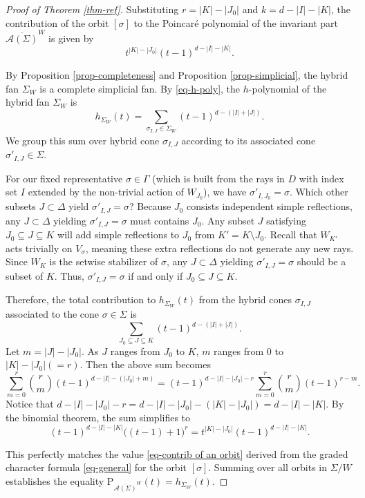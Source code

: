 \documentclass{amsart}
\theoremstyle{definition}
\theoremstyle{remark}
\numberwithin{equation}{section}
\begin{document}
\begin{proof}[Proof of Theorem \ref{thm-ref}]
Substituting $r = |K| - |J_0|$ and $k = d - |I| - |K|$, the contribution of the orbit $[\sigma]$ to the Poincar\'e polynomial of the invariant part $\overline{\mathcal{A}(\Sigma)}^W$ is given by 
\begin{equation} \label{eq-contrib of an orbit}
   t^{|K| - |J_0|} (t-1)^{d - |I| - |K|}.  
\end{equation}

By Proposition \ref{prop-completeness} and Proposition \ref{prop-simplicial}, the hybrid fan $\Sigma_W$ is a complete simplicial fan. By \eqref{eq-h-poly}, the $h$-polynomial of the hybrid fan $\Sigma_W$ is
$$h_{\Sigma_W}(t) = \sum_{\sigma_{I,J} \in \Sigma_W} (t-1)^{d - (|I| + |J|)}.$$
We group this sum over hybrid cone $\sigma_{I,J}$ according to its associated cone $\sigma'_{I,J} \in \Sigma$. 

For our fixed representative $\sigma \in \Gamma$ (which is built from the rays in $D$ with index set $I$ extended by the non-trivial action of $W_{J_0}$), we have $\sigma'_{I, J_0} = \sigma$. 
Which other subsets $J\subset \Delta$ yield $\sigma'_{I,J} = \sigma$? Because $J_0$ consists independent simple reflections, any $J\subset \Delta$ yielding $\sigma'_{I,J} = \sigma$ must contains $J_0$.
Any subset $J$ satisfying $J_0 \subseteq J \subseteq K$ will add simple reflections to $J_0$ from $K' = K \setminus J_0$. Recall that $W_{K'}$ acts trivially on $V_\sigma$, meaning these extra reflections do not generate any new rays. Since $W_{K}$ is the setwise stabilizer of $\sigma$, any $J\subset \Delta$ yielding $\sigma'_{I,J} = \sigma$ should be a subset of $K$. Thus, $\sigma'_{I,J} = \sigma$ if and only if $J_0 \subseteq J \subseteq K$.

Therefore, the total contribution to $h_{\Sigma_W}(t)$ from the hybrid cones $\sigma_{I,J}$ associated to the cone $\sigma\in \Sigma$ is
$$\sum_{J_0 \subseteq J \subseteq K} (t-1)^{d - (|I| + |J|)}.$$
Let $m = |J| - |J_0|$. As $J$ ranges from $J_0$ to $K$, $m$ ranges from $0$ to $|K| - |J_0| (= r)$. Then the above sum becomes
$$\sum_{m=0}^r \binom{r}{m} (t-1)^{d - |I| - (|J_0| + m)} = (t-1)^{d - |I| - |J_0| - r} \sum_{m=0}^r \binom{r}{m} (t-1)^{r-m}.$$
Notice that $d - |I| - |J_0| - r = d - |I| - |J_0| - (|K| - |J_0|) = d - |I| - |K|$. By the binomial theorem, the sum simplifies to
$$(t-1)^{d - |I| - |K|} \big( (t-1) + 1 \big)^r = t^{|K| - |J_0|} (t-1)^{d - |I| - |K|}.$$

This perfectly matches the value \eqref{eq-contrib of an orbit} derived from the graded character formula \eqref{eq-general} for the orbit $[\sigma]$. Summing over all orbits in $\Sigma/W$ establishes the equality $\mathrm{P}_{\overline{\mathcal{A}(\Sigma)}^W}(t) = h_{\Sigma_W}(t)$.
\end{proof}
\end{document}
